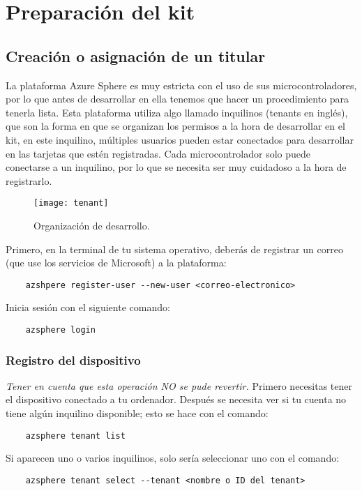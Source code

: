 \section{Preparación del kit}
\subsection{Creación o asignación de un titular}
La plataforma Azure Sphere es muy estricta con el uso de sus microcontroladores, por lo que antes de desarrollar en ella tenemos que hacer un procedimiento para tenerla lista. Esta plataforma utiliza algo llamado inquilinos (tenants en inglés), que son la forma en que se organizan los permisos a la hora de desarrollar en el kit, en este inquilino, múltiples usuarios pueden estar conectados para desarrollar en las tarjetas que estén registradas. Cada microcontrolador solo puede conectarse a un inquilino, por lo que se necesita ser muy cuidadoso a la hora de registrarlo.

\begin{figure}[h]
	\centering
	\texttt{[image: tenant]}
	\caption{Organización de desarrollo.}
\end{figure}

Primero, en la terminal de tu sistema operativo, deberás de registrar un correo (que use los servicios de Microsoft) a la plataforma: 
\begin{verbatim}
	azshpere register-user --new-user <correo-electronico>
\end{verbatim}

Inicia sesión con el siguiente comando:
\begin{verbatim}
	azsphere login
\end{verbatim}

\subsubsection{Registro del dispositivo}
\textit{Tener en cuenta que esta operación NO se pude revertir.}
\linebreak
\linebreak
Primero necesitas tener el dispositivo conectado a tu ordenador. Después se necesita ver si tu cuenta no tiene algún inquilino disponible; esto se hace con el comando:
\begin{verbatim}
	azsphere tenant list
\end{verbatim}
Si aparecen uno o varios inquilinos, solo sería seleccionar uno con el comando:
\begin{verbatim}
	azsphere tenant select --tenant <nombre o ID del tenant>
\end{verbatim}

